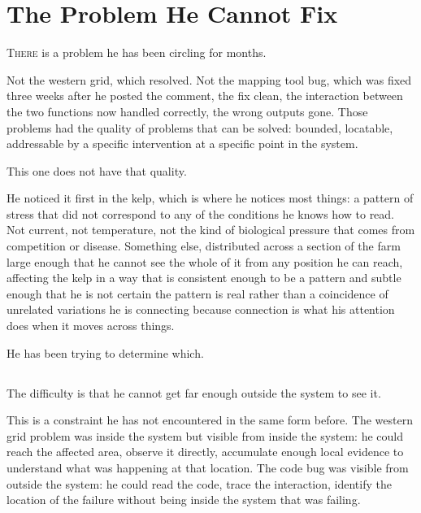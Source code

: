 
\chapter{The Problem He Cannot Fix}


\lettrine{T}{here} is a problem he has been circling for months.

Not the western grid, which resolved. Not the mapping
tool bug, which was fixed three weeks after he posted
the comment, the fix clean, the interaction between
the two functions now handled correctly, the wrong
outputs gone. Those problems had the quality of
problems that can be solved: bounded, locatable,
addressable by a specific intervention at a specific
point in the system.

This one does not have that quality.

He noticed it first in the kelp, which is where
he notices most things: a pattern of stress that
did not correspond to any of the conditions he
knows how to read. Not current, not temperature,
not the kind of biological pressure that comes
from competition or disease. Something else,
distributed across a section of the farm large
enough that he cannot see the whole of it from
any position he can reach, affecting the kelp
in a way that is consistent enough to be a
pattern and subtle enough that he is not certain
the pattern is real rather than a coincidence of
unrelated variations he is connecting because
connection is what his attention does when it
moves across things.

He has been trying to determine which.

\section{}

The difficulty is that he cannot get far enough
outside the system to see it.

This is a constraint he has not encountered in
the same form before. The western grid problem
was inside the system but visible from inside the
system: he could reach the affected area, observe
it directly, accumulate enough local evidence to
understand what was happening at that location.
The code bug was visible from outside the system:
he could read the code, trace the interaction,
identify the location of the failure without being
inside the system that was failing.

